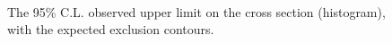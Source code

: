 \newpage
\begin{figure}[h!]
  \begin{center}
     \\
    \caption{
      The 95\% C.L. observed upper limit on the cross section (histogram), with the expected exclusion contours. 
    }
    \label{fig:T1bbbb}
  \end{center}
\end{figure}
%
